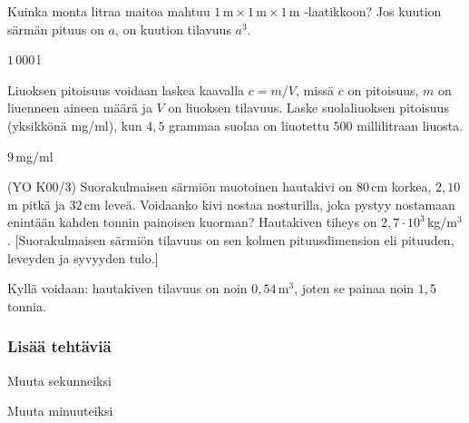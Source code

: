 \begin{tehtavasivu}

\begin{tehtava}
Kuinka monta litraa maitoa mahtuu $1\,\textrm{m}\times 1\,\textrm{m}\times 1\,\textrm{m}$ -laatikkoon? Jos kuution särmän pituus on $a$, on kuution tilavuus $a^3$.
	\begin{vastaus}
	$1\,000$\,l
	\end{vastaus}
\end{tehtava}

\begin{tehtava}
Liuoksen pitoisuus voidaan laskea kaavalla $c=m/V$, missä $c$ on pitoisuus, $m$ on liuenneen aineen määrä ja $V$ on liuoksen tilavuus. Laske suolaliuoksen pitoisuus (yksikkönä mg/ml), kun $4,5$ grammaa suolaa on liuotettu $500$ millilitraan liuosta. %
\begin{vastaus}
$9$\,mg/ml
\end{vastaus}
\end{tehtava}

\begin{tehtava}
(YO K00/3) Suorakulmaisen särmiön muotoinen hautakivi on $80$\,cm korkea, $2,10$\,m pitkä ja $32$\,cm leveä.
Voidaanko kivi nostaa nosturilla, joka pystyy nostamaan enintään kahden tonnin painoisen kuorman? Hautakiven tiheys on $2,7 \cdot 10^3$\,kg/m$^3$. [Suorakulmaisen särmiön tilavuus on sen kolmen pituusdimension eli pituuden, leveyden ja syvyyden tulo.]
\begin{vastaus}
Kyllä voidaan: hautakiven tilavuus on noin $0,54$\,m$^3$, joten se painaa noin $1,5$ tonnia.
\end{vastaus}
\end{tehtava}

\subsubsection*{Lisää tehtäviä}

\begin{tehtava}
Muuta sekunneiksi
\begin{vastaus}
\end{vastaus}
\end{tehtava}

\begin{tehtava}
Muuta minuuteiksi
\begin{vastaus}
\end{vastaus}
\end{tehtava}


\end{tehtavasivu}
